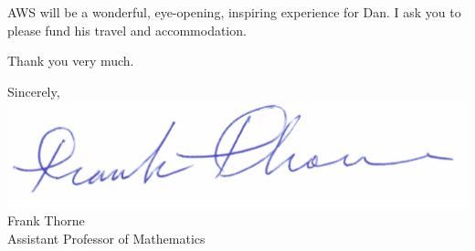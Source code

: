 \documentclass[11pt]{article}
\begin{document}
AWS will be a wonderful, eye-opening, inspiring experience for Dan. I ask you to please fund his travel and accommodation.

Thank you very much.
\vskip0.5in
\hspace{.5\textwidth}\parbox[t]{2.95in}{
		    Sincerely,\\
		   \includegraphics{mysignature.jpg}\\ 

		    Frank Thorne\\
		    Assistant Professor of Mathematics
		   }

\vfill
\end{document}
